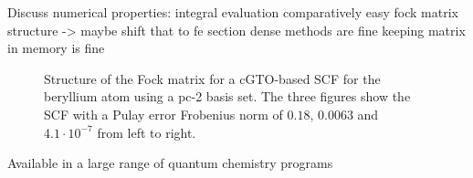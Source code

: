 Discuss numerical properties:
integral evaluation comparatively easy
fock matrix structure -> maybe shift that to fe section
dense methods are fine
keeping matrix in memory is fine

\begin{landscape}
\begin{figure}
	\centering
	\caption{Structure of the Fock matrix for a cGTO-based SCF
		for the beryllium atom
		using a pc-2 basis set.
		The three figures show the SCF with a Pulay error
		Frobenius norm of $0.18$, $0.0063$ and $4.1 \cdot 10^{-7}$
		from left to right.}
	\label{fig:StructureGaussianFock}
\end{figure}
\end{landscape}



%
%



Available in a large range of quantum chemistry programs
\cite{Ahlrichs1989,ORCA,Hutter2014,Sun2017,Verstraelen2017,PyQuante}
